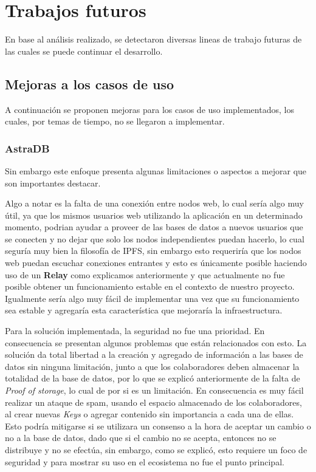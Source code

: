 \section{Trabajos futuros}

En base al análisis realizado, se detectaron diversas lineas de trabajo futuras de las cuales se puede continuar el desarrollo.

\subsection{Mejoras a los casos de uso}

A continuación se proponen mejoras para los casos de uso implementados, los cuales, por temas de tiempo, no se llegaron a implementar.

\subsubsection{AstraDB}

Sin embargo este enfoque presenta algunas limitaciones o aspectos a mejorar que son importantes destacar.

Algo a notar es la falta de una conexión entre nodos web, lo cual sería algo muy útil, ya que los mismos usuarios web utilizando la aplicación en un determinado momento, podrian ayudar a proveer de las bases de datos a nuevos usuarios que se conecten y no dejar que solo los nodos independientes puedan hacerlo, lo cual seguría muy bien la filosofía de IPFS, sin embargo esto requeriría que los nodos web puedan escuchar conexiones entrantes y esto es únicamente posible haciendo uso de un \textbf{Relay} como explicamos anteriormente y que actualmente no fue posible obtener un funcionamiento estable en el contexto de nuestro proyecto. Igualmente sería algo muy fácil de implementar una vez que su funcionamiento sea estable y agregaría esta característica que mejoraría la infraestructura.

Para la solución implementada, la seguridad no fue una prioridad. En consecuencia se presentan algunos problemas que están relacionados con esto. La solución da total libertad a la creación y agregado de información a las bases de datos sin ninguna limitación, junto a que los colaboradores deben almacenar la totalidad de la base de datos, por lo que se explicó anteriormente de la falta de \textit{Proof of storage}, lo cual de por si es un limitación. En consecuencia es muy fácil realizar un ataque de spam, usando el espacio almacenado de los colaboradores, al crear nuevas \textit{Keys} o agregar contenido sin importancia a cada una de ellas. Esto podría mitigarse si se utilizara un consenso a la hora de aceptar un cambio o no a la base de datos, dado que si el cambio no se acepta, entonces no se distribuye y no se efectúa, sin embargo, como se explicó, esto requiere un foco de seguridad y para mostrar su uso en el ecosistema no fue el punto principal.

